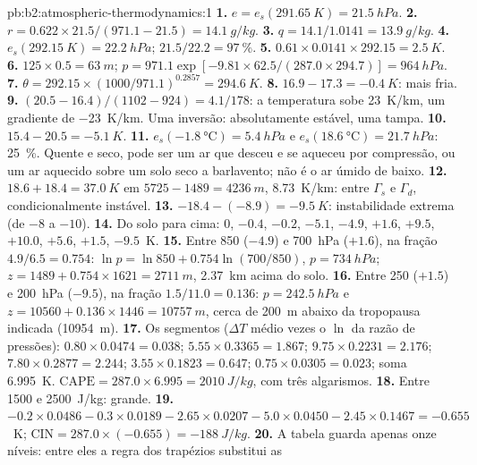 \begin{solution}{pb:b2:atmospheric-thermodynamics:1}
\textbf{1.} $e = e_s(\qty{291.65}{K}) = \qty{21.5}{hPa}$.
\textbf{2.} $r = 0.622 \times 21.5/(971.1 - 21.5) = \qty{14.1}{g/kg}$.
\textbf{3.} $q = 14.1/1.0141 = \qty{13.9}{g/kg}$.
\textbf{4.} $e_s(\qty{292.15}{K}) = \qty{22.2}{hPa}$; $21.5/22.2 = \qty{97}{\percent}$.
\textbf{5.} $0.61 \times 0.0141 \times 292.15 = \qty{2.5}{K}$.
\textbf{6.} $125 \times 0.5 = \qty{63}{m}$; $p = 971.1 \exp[-9.81 \times 62.5/(287.0 \times 294.7)]
= \qty{964}{hPa}$.
\textbf{7.} $\theta = 292.15 \times (1000/971.1)^{0.2857} = \qty{294.6}{K}$.
\textbf{8.} $16.9 - 17.3 = \qty{-0.4}{K}$: mais fria.
\textbf{9.} $(20.5 - 16.4)/(1102 - 924) = 4.1/178$: a temperatura sobe \qty{23}{K/km}, um
gradiente de \qty{-23}{K/km}. Uma inversão: absolutamente estável, uma tampa.
\textbf{10.} $15.4 - 20.5 = \qty{-5.1}{K}$.
\textbf{11.} $e_s(\qty{-1.8}{\celsius}) = \qty{5.4}{hPa}$ e $e_s(\qty{18.6}{\celsius}) =
\qty{21.7}{hPa}$: \qty{25}{\percent}. Quente e seco, pode ser um ar que desceu e se aqueceu por
compressão, ou um ar aquecido sobre um solo seco a barlavento; não é o ar úmido de baixo.
\textbf{12.} $18.6 + 18.4 = \qty{37.0}{K}$ em $5725 - 1489 = \qty{4236}{m}$, \qty{8.73}{K/km}: entre $\Gamma_s$ e
$\Gamma_d$, condicionalmente instável.
\textbf{13.} $-18.4 - (-8.9) = \qty{-9.5}{K}$: instabilidade extrema (de $-8$ a $-10$).
\textbf{14.} Do solo para cima: 0, $-0.4$, $-0.2$, $-5.1$, $-4.9$, $+1.6$, $+9.5$, $+10.0$,
$+5.6$, $+1.5$, $-9.5$~\unit{K}.
\textbf{15.} Entre 850 ($-4.9$) e \qty{700}{hPa} ($+1.6$), na fração $4.9/6.5 = 0.754$:
$\ln p = \ln 850 + 0.754 \ln(700/850)$, $p = \qty{734}{hPa}$; $z = 1489 + 0.754 \times 1621 =
\qty{2711}{m}$, \qty{2.37}{km} acima do solo.
\textbf{16.} Entre 250 ($+1.5$) e \qty{200}{hPa} ($-9.5$), na fração $1.5/11.0 =
0.136$: $p = \qty{242.5}{hPa}$ e $z = 10560 + 0.136 \times 1446 = \qty{10757}{m}$, cerca de
\qty{200}{m} abaixo da tropopausa indicada (\qty{10954}{m}).
\textbf{17.} Os segmentos ($\Delta T$ médio vezes o $\ln$ da razão de pressões): $0.80 \times 0.0474
= 0.038$; $5.55 \times 0.3365 = 1.867$; $9.75 \times 0.2231 = 2.176$; $7.80 \times 0.2877 =
2.244$; $3.55 \times 0.1823 = 0.647$; $0.75 \times 0.0305 = 0.023$; soma \qty{6.995}{K}.
$\text{CAPE} = 287.0 \times 6.995 = \qty{2010}{J/kg}$, com três algarismos.
\textbf{18.} Entre 1500 e \qty{2500}{J/kg}: grande.
\textbf{19.} $-0.2 \times 0.0486 - 0.3 \times 0.0189 - 2.65 \times 0.0207 - 5.0 \times 0.0450 -
2.45 \times 0.1467 = -0.655$~\unit{K}; $\text{CIN} = 287.0 \times (-0.655) = \qty{-188}{J/kg}$.
\textbf{20.} A tabela guarda apenas onze níveis: entre eles a regra dos trapézios substitui as

\end{solution}
